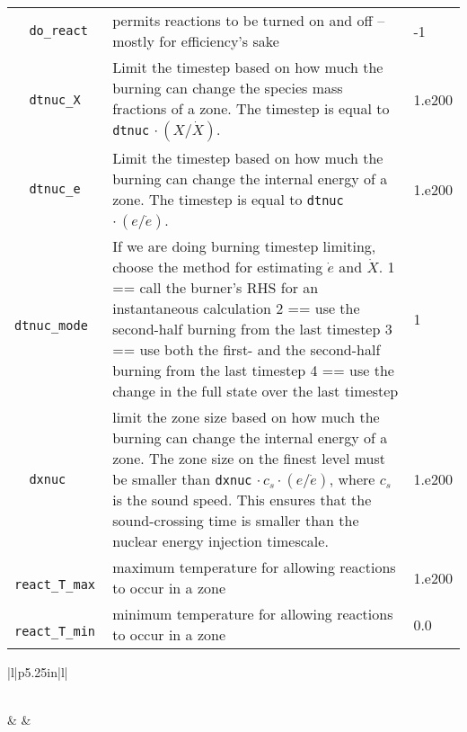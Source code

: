 \begin{landscape}
{\begin{center}
\begin{longtable}{|l|p{5.25in}|l|}
\rowcolor{tableShade}
\verb=  do_react  = &   permits reactions to be turned on and off -- mostly for efficiency's sake  &  -1 \\
\verb=  dtnuc_X  = &   Limit the timestep based on how much the burning can change the species mass fractions of a zone. The timestep is equal to {\tt dtnuc}  $\cdot\,(X / \dot{X})$.  &  1.e200 \\
\rowcolor{tableShade}
\verb=  dtnuc_e  = &   Limit the timestep based on how much the burning can change the internal energy of a zone. The timestep is equal to {\tt dtnuc}  $\cdot\,(e / \dot{e})$.  &  1.e200 \\
\verb=  dtnuc_mode  = &   If we are doing burning timestep limiting, choose the method for estimating $\dot{e}$ and $\dot{X}$. 1 == call the burner's RHS for an instantaneous calculation 2 == use the second-half burning from the last timestep 3 == use both the first- and the second-half burning from the last timestep 4 == use the change in the full state over the last timestep  &  1 \\
\rowcolor{tableShade}
\verb=  dxnuc  = &   limit the zone size based on how much the burning can change the internal energy of a zone. The zone size on the finest level must be smaller than {\tt dxnuc} $\cdot\, c_s\cdot (e / \dot{e})$, where $c_s$ is the sound speed. This ensures that the sound-crossing time is smaller than the nuclear energy injection timescale.  &  1.e200 \\
\verb=  react_T_max  = &   maximum temperature for allowing reactions to occur in a zone  &  1.e200 \\
\rowcolor{tableShade}
\verb=  react_T_min  = &   minimum temperature for allowing reactions to occur in a zone  &  0.0 \\


\end{longtable}
\end{center}

} %


{\small

\renewcommand{\arraystretch}{1.5}
%
\begin{center}
\begin{longtable}{|l|p{5.25in}|l|}
\caption[ refinement
 parameters.]{ refinement
 parameters.} \label{table:  refinement
 parameters. runtime} \\
%
\hline {} & 
        & 
        \\ \hline 
\endfirsthead


\end{longtable}
\end{center}}
\end{landscape}

